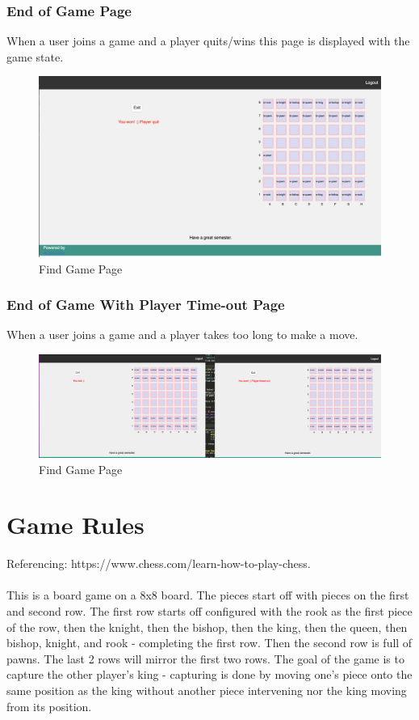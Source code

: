 \documentclass[12pt]{article}
\begin{document}
\subsubsection{End of Game Page}
When a user joins a game and a player quits/wins this page is displayed with the game state.
\begin{figure}[!hb]
    \includegraphics[width=\linewidth,scale=0.5]{PLAYER_WON_PLAYER_QUIT.png}
    \caption{Find Game Page}
\end{figure}

\subsubsection{End of Game With Player Time-out Page}
When a user joins a game and a player takes too long to make a move.
\begin{figure}[h!]
    \includegraphics[width=\linewidth]{PLAYER_TIMED_OUT.png}
    \caption{Find Game Page}
\end{figure}

\section{Game Rules}
Referencing: https://www.chess.com/learn-how-to-play-chess.\\\\
This is a board game on a 8x8 board. The pieces start off with pieces on the first and second row. The first row starts off configured with the rook as the first piece of the row, then the knight, then the bishop, then the king, then the queen, then bishop, knight, and rook - completing the first row. Then the second row is full of pawns. The last 2 rows will mirror the first two rows. The goal of the game is to capture the other player's king - capturing is done by moving one's piece onto the same position as the king without another piece intervening nor the king moving from its position.
\end{document}
